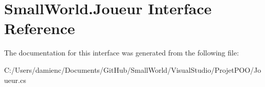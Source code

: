\hypertarget{interface_small_world_1_1_joueur}{\section{Small\-World.\-Joueur Interface Reference}
\label{interface_small_world_1_1_joueur}
}


The documentation for this interface was generated from the following file\-:\begin{DoxyCompactItemize}
\item 
C\-:/\-Users/damienc/\-Documents/\-Git\-Hub/\-Small\-World/\-Visual\-Studio/\-Projet\-P\-O\-O/Joueur.\-cs\end{DoxyCompactItemize}
